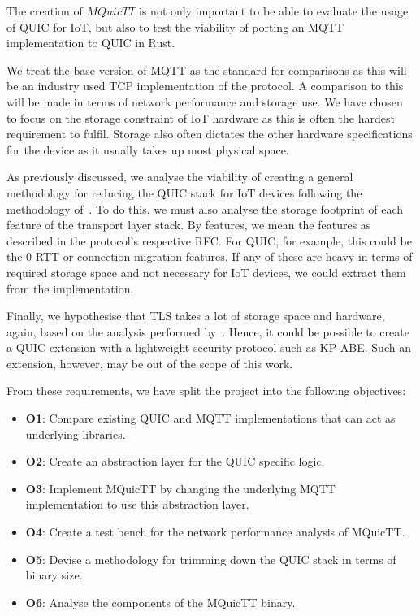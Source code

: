 The creation of $MQuicTT$ is not only important to be able to evaluate the usage of QUIC for IoT, but also to test the viability of porting an MQTT implementation to QUIC in Rust.

We treat the base version of MQTT as the standard for comparisons as this will be an industry used TCP implementation of the protocol.
A comparison to this will be made in terms of network performance and storage use.
We have chosen to focus on the storage constraint of IoT hardware as this is often the hardest requirement to fulfil.
Storage also often dictates the other hardware specifications for the device as it usually takes up most physical space.

As previously discussed, we analyse the viability of creating a general methodology for reducing the QUIC stack for IoT devices following the methodology of~\cite{eggert_towards_2020}.
To do this, we must also analyse the storage footprint of each feature of the transport layer stack.
By features, we mean the features as described in the protocol's respective RFC.
For QUIC, for example, this could be the 0-RTT or connection migration features.
If any of these are heavy in terms of required storage space and not necessary for IoT devices, we could extract them from the implementation.

Finally, we hypothesise that TLS takes a lot of storage space and hardware, again, based on the analysis performed by~\cite{eggert_towards_2020}.
Hence, it could be possible to create a QUIC extension with a lightweight security protocol such as KP-ABE.
Such an extension, however, may be out of the scope of this work.

From these requirements, we have split the project into the following objectives:

\begin{itemize}
    \item \textbf{O1}: Compare existing QUIC and MQTT implementations that can act as underlying libraries.
    \item \textbf{O2}: Create an abstraction layer for the QUIC specific logic.
    \item \textbf{O3}: Implement MQuicTT by changing the underlying MQTT implementation to use this abstraction layer.
    \item \textbf{O4}: Create a test bench for the network performance analysis of MQuicTT.
    \item \textbf{O5}: Devise a methodology for trimming down the QUIC stack in terms of binary size.
    \item \textbf{O6}: Analyse the components of the MQuicTT binary.
\end{itemize}

